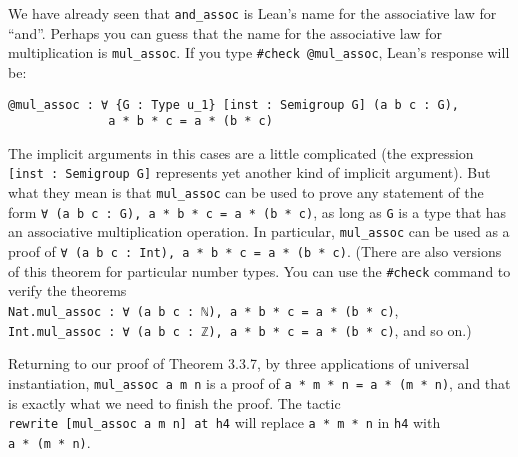\documentclass[
  letterpaper,
  DIV=11,
  numbers=noendperiod]{scrreprt}
\newenvironment{ind}
	{\begin{list}{}{\setlength{\leftmargin}{1em}}\item\relax}
	{\end{list}}
\theoremstyle{remark}
\begin{document}
We have already seen that \texttt{and\_assoc} is Lean's name for the
associative law for ``and''. Perhaps you can guess that the name for the
associative law for multiplication is \texttt{mul\_assoc}. If you type
\texttt{\#check\ @mul\_assoc}, Lean's response will be:

\begin{ind}

\begin{verbatim}
@mul_assoc : ∀ {G : Type u_1} [inst : Semigroup G] (a b c : G),
              a * b * c = a * (b * c)
\end{verbatim}

\end{ind}

The implicit arguments in this cases are a little complicated (the
expression \texttt{{[}inst\ :\ Semigroup\ G{]}} represents yet another
kind of implicit argument). But what they mean is that
\texttt{mul\_assoc} can be used to prove any statement of the form
\texttt{∀\ (a\ b\ c\ :\ G),\ a\ *\ b\ *\ c\ =\ a\ *\ (b\ *\ c)}, as long
as \texttt{G} is a type that has an associative multiplication
operation. In particular, \texttt{mul\_assoc} can be used as a proof of
\texttt{∀\ (a\ b\ c\ :\ Int),\ a\ *\ b\ *\ c\ =\ a\ *\ (b\ *\ c)}.
(There are also versions of this theorem for particular number types.
You can use the \texttt{\#check} command to verify the theorems
\texttt{Nat.mul\_assoc\ :\ ∀\ (a\ b\ c\ :\ ℕ),\ a\ *\ b\ *\ c\ =\ a\ *\ (b\ *\ c)},
\texttt{Int.mul\_assoc\ :\ ∀\ (a\ b\ c\ :\ ℤ),\ a\ *\ b\ *\ c\ =\ a\ *\ (b\ *\ c)},
and so on.)

Returning to our proof of Theorem 3.3.7, by three applications of
universal instantiation, \texttt{mul\_assoc\ a\ m\ n} is a proof of
\texttt{a\ *\ m\ *\ n\ =\ a\ *\ (m\ *\ n)}, and that is exactly what we
need to finish the proof. The tactic
\texttt{rewrite\ {[}mul\_assoc\ a\ m\ n{]}\ at\ h4} will replace
\texttt{a\ *\ m\ *\ n} in \texttt{h4} with \texttt{a\ *\ (m\ *\ n)}.
\end{document}

